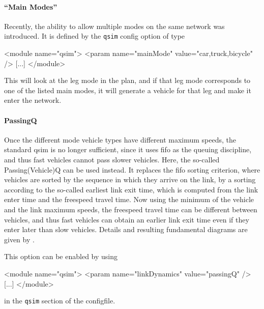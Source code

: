 
\paragraph{\enquote{Main Modes}}
Recently, the ability to allow multiple modes on the same network was introduced.  It is defined by the \lstinline{qsim} config option of type
\begin{xml}
<module name="qsim">
   <param name="mainMode" value="car,truck,bicycle" />
   [...]
</module>
\end{xml}
This will look at the leg mode in the plan, and if that leg mode corresponds to one of the listed main modes, it will generate a vehicle for that leg and make it enter the network.

\paragraph{PassingQ} 
Once the different mode vehicle types have different maximum speeds, the standard \gls{qsim} is no longer sufficient, since it uses \acrfull{fifo} as the queuing discipline, and thus fast vehicles cannot pass slower vehicles.  Here, the so-called Passing(Vehicle)Q can be used instead.  It replaces the \gls{fifo} sorting criterion, where vehicles are sorted by the sequence in which they arrive on the link, by a sorting according to the so-called earliest link exit time, which is computed from the link enter time and the freespeed travel time.  Now using the minimum of the vehicle and the link maximum speeds, the freespeed travel time can be different between vehicles, and thus fast vehicles can obtain an earlier link exit time even if they enter later than slow vehicles.  Details and resulting fundamental diagrams are given by \cite{AgarwalEtcMixedTraffic}.

This option can be enabled by using
\begin{xml}
<module name="qsim">
   <param name="linkDynamics" value="passingQ" />
   [...]
</module>
\end{xml}
in the \lstinline{qsim} section of the \gls{configfile}.

